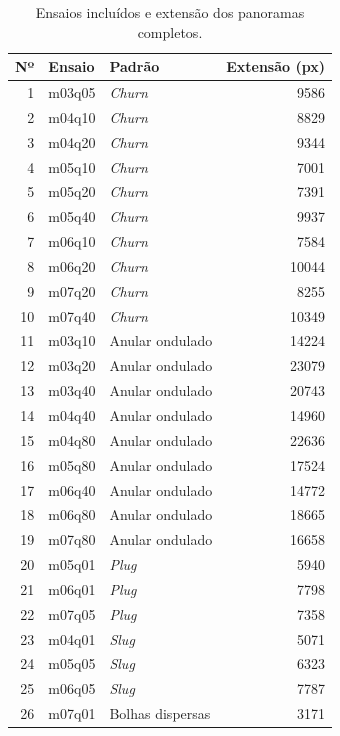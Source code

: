 \begin{table}[htbp]
  \centering
  \caption{Ensaios incluídos e extensão dos panoramas completos.}
  \label{tab:res-ensaios}
  \small
  \begin{tabular}{r l l r}
    \hline
    \textbf{Nº} & \textbf{Ensaio} & \textbf{Padrão} & \textbf{Extensão (px)}\\
    \hline
    1 & m03q05 & \textit{Churn} & 9586\\
    2 & m04q10 & \textit{Churn} & 8829\\
    3 & m04q20 & \textit{Churn} & 9344\\
    4 & m05q10 & \textit{Churn} & 7001\\
    5 & m05q20 & \textit{Churn} & 7391\\
    6 & m05q40 & \textit{Churn} & 9937\\
    7 & m06q10 & \textit{Churn} & 7584\\
    8 & m06q20 & \textit{Churn} & 10044\\
    9 & m07q20 & \textit{Churn} & 8255\\
    10 & m07q40 & \textit{Churn} & 10349\\
    \hline
    11 & m03q10 & Anular ondulado & 14224\\
    12 & m03q20 & Anular ondulado & 23079\\
    13 & m03q40 & Anular ondulado & 20743\\
    14 & m04q40 & Anular ondulado & 14960\\
    15 & m04q80 & Anular ondulado & 22636\\
    16 & m05q80 & Anular ondulado & 17524\\
    17 & m06q40 & Anular ondulado & 14772\\
    18 & m06q80 & Anular ondulado & 18665\\
    19 & m07q80 & Anular ondulado & 16658\\
    \hline
    20 & m05q01 & \textit{Plug} & 5940\\
    21 & m06q01 & \textit{Plug} & 7798\\
    22 & m07q05 & \textit{Plug} & 7358\\
    23 & m04q01 & \textit{Slug} & 5071\\
    24 & m05q05 & \textit{Slug} & 6323\\
    25 & m06q05 & \textit{Slug} & 7787\\
    26 & m07q01 & Bolhas dispersas & 3171\\
    \hline
  \end{tabular}
\end{table}

